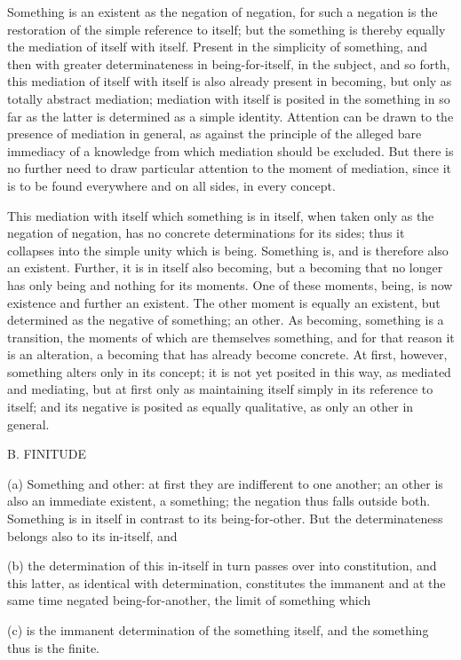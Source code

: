 Something is an existent as the negation of negation,
for such a negation is the restoration of
the simple reference to itself;
but the something is thereby equally
the mediation of itself with itself.
Present in the simplicity of something,
and then with greater determinateness in being-for-itself,
in the subject, and so forth,
this mediation of itself with itself is
also already present in becoming,
but only as totally abstract mediation;
mediation with itself is posited in the something
in so far as the latter is determined as a simple identity.
Attention can be drawn to the presence of mediation in general,
as against the principle of the alleged bare immediacy of a knowledge
from which mediation should be excluded.
But there is no further need to draw
particular attention to the moment of mediation,
since it is to be found everywhere and on all sides,
in every concept.

This mediation with itself which something is in itself,
when taken only as the negation of negation,
has no concrete determinations for its sides;
thus it collapses into the simple unity which is being.
Something is, and is therefore also an existent.
Further, it is in itself also becoming,
but a becoming that no longer has only
being and nothing for its moments.
One of these moments, being, is now
existence and further an existent.
The other moment is equally an existent,
but determined as the negative of something; an other.
As becoming, something is a transition,
the moments of which are themselves something,
and for that reason it is an alteration,
a becoming that has already become concrete.
At first, however, something alters only in its concept;
it is not yet posited in this way, as mediated and mediating,
but at first only as maintaining itself
simply in its reference to itself;
and its negative is posited as equally qualitative,
as only an other in general.

B. FINITUDE

(a) Something and other:
at first they are indifferent to one another;
an other is also an immediate existent, a something;
the negation thus falls outside both.
Something is in itself in contrast to its being-for-other.
But the determinateness belongs also to its in-itself, and

(b) the determination of this in-itself
in turn passes over into constitution,
and this latter, as identical with determination,
constitutes the immanent and at the same time
negated being-for-another,
the limit of something which

(c) is the immanent determination of the something itself,
and the something thus is the finite.

